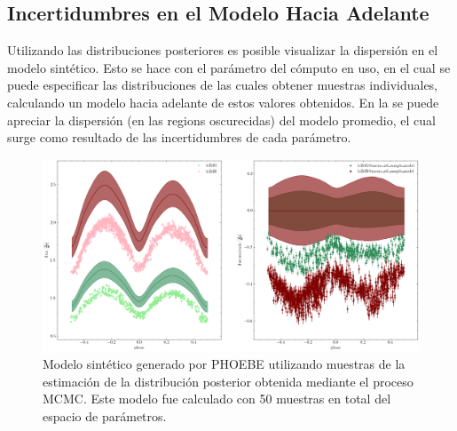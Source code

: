 \subsection{Incertidumbres en el Modelo Hacia Adelante}

Utilizando las distribuciones posteriores es posible visualizar la dispersión en
el modelo sintético. Esto se hace con el parámetro  del
cómputo en uso, en el cual se puede especificar las distribuciones de las cuales
obtener muestras individuales, calculando un modelo hacia adelante de estos
valores obtenidos. En la  se
puede apreciar la dispersión (en las regions oscurecidas) del modelo promedio,
el cual surge como resultado de las incertidumbres de cada parámetro.

\begin{figure}[!ht]
	\centering
	\includegraphics[scale=0.51]{Metodologia/Secciones/ModeloComputacional/Figures/Figura MCMC ZTF Modelo.png}
	\caption{Modelo sintético generado por PHOEBE utilizando muestras de la
	estimación de la distribución posterior obtenida mediante el proceso MCMC. Este modelo fue calculado con 50 muestras en total del espacio de parámetros.}
	\label{figuraMcmcZtfModeloDispersionPosterior}
\end{figure}